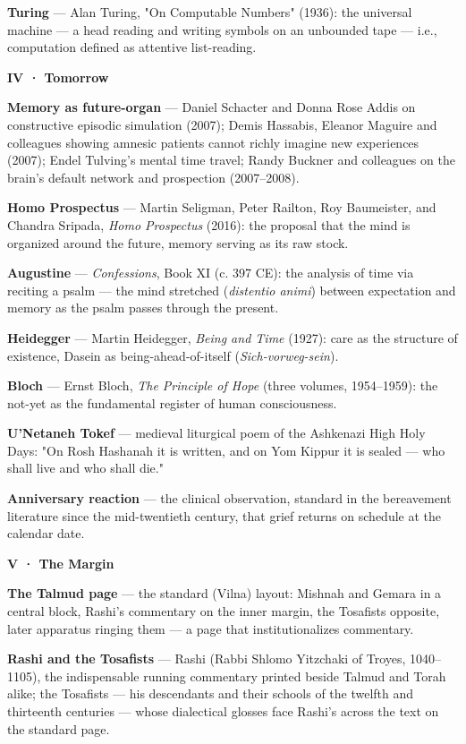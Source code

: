 \documentclass[11pt]{article}
\begin{document}
\textbf{Turing} — Alan Turing, "On Computable Numbers" (1936): the universal machine — a head reading and writing symbols on an unbounded tape — i.e., computation defined as attentive list-reading.

\textbf{IV · Tomorrow}

\textbf{Memory as future-organ} — Daniel Schacter and Donna Rose Addis on constructive episodic simulation (2007); Demis Hassabis, Eleanor Maguire and colleagues showing amnesic patients cannot richly imagine new experiences (2007); Endel Tulving's mental time travel; Randy Buckner and colleagues on the brain's default network and prospection (2007–2008).

\textbf{Homo Prospectus} — Martin Seligman, Peter Railton, Roy Baumeister, and Chandra Sripada, \emph{Homo Prospectus} (2016): the proposal that the mind is organized around the future, memory serving as its raw stock.

\textbf{Augustine} — \emph{Confessions}, Book XI (c. 397 CE): the analysis of time via reciting a psalm — the mind stretched (\emph{distentio animi}) between expectation and memory as the psalm passes through the present.

\textbf{Heidegger} — Martin Heidegger, \emph{Being and Time} (1927): care as the structure of existence, Dasein as being-ahead-of-itself (\emph{Sich-vorweg-sein}).

\textbf{Bloch} — Ernst Bloch, \emph{The Principle of Hope} (three volumes, 1954–1959): the not-yet as the fundamental register of human consciousness.

\textbf{U'Netaneh Tokef} — medieval liturgical poem of the Ashkenazi High Holy Days: "On Rosh Hashanah it is written, and on Yom Kippur it is sealed — who shall live and who shall die."

\textbf{Anniversary reaction} — the clinical observation, standard in the bereavement literature since the mid-twentieth century, that grief returns on schedule at the calendar date.

\textbf{V · The Margin}

\textbf{The Talmud page} — the standard (Vilna) layout: Mishnah and Gemara in a central block, Rashi's commentary on the inner margin, the Tosafists opposite, later apparatus ringing them — a page that institutionalizes commentary.

\textbf{Rashi and the Tosafists} — Rashi (Rabbi Shlomo Yitzchaki of Troyes, 1040–1105), the indispensable running commentary printed beside Talmud and Torah alike; the Tosafists — his descendants and their schools of the twelfth and thirteenth centuries — whose dialectical glosses face Rashi's across the text on the standard page.
\end{document}
